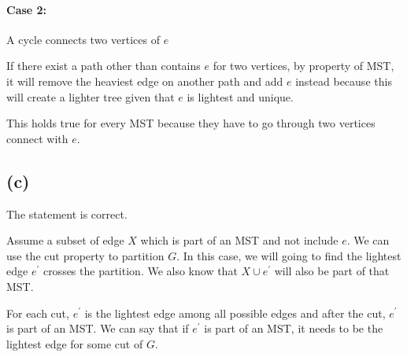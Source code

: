 \documentclass{article}
\begin{document}
\paragraph*{Case 2:} A cycle connects two vertices of $e$

If there exist a path other than contains $e$ for two vertices, by property of MST, it will remove the
heaviest edge on another path and add $e$ instead because this will create a lighter tree given that $e$ is lightest and unique.

This holds true for every MST because they have to go through two vertices connect with $e$.

\subsection*{(c)}
The statement is correct.

Assume a subset of edge $X$ which is part of an MST and not include $e$. We can use the cut property
to partition $G$. In this case, we will going to find the lightest edge $e^\prime$ crosses the partition.
We also know that $X \cup e^\prime$ will also be part of that MST.

For each cut, $e^\prime$ is the lightest edge among all possible edges and after the cut, $e^\prime$ is part of an MST.
We can say that if $e^\prime$ is part of an MST, it needs to be the lightest edge for some cut of $G$.
\end{document}
